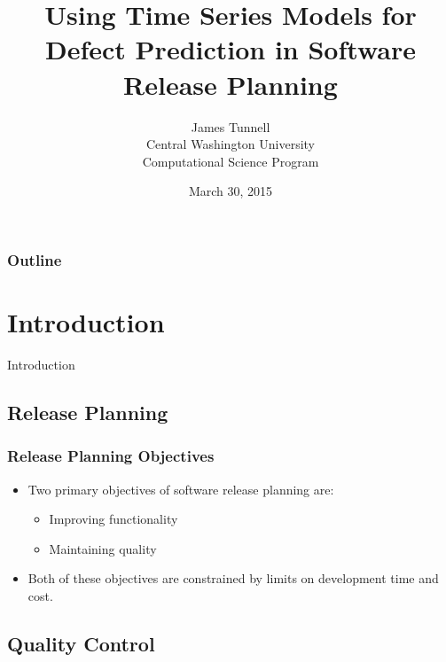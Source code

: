 \documentclass[presentation]{beamer}
\begin{document}
\title{Using Time Series Models for Defect Prediction in Software Release Planning}
\author{James Tunnell \\
Central Washington University \\
Computational Science Program}
\date{March 30, 2015}

\begin{frame}
\titlepage
\end{frame}

\begin{frame}
\small{
\frametitle{Outline}
\tableofcontents[hideallsubsections] 
}
\end{frame}

\section{Introduction}

\begin{frame}
\begin{center}
\Large{Introduction}
\end{center}
\end{frame}

\subsection{Release Planning}

\begin{frame}[t]
\frametitle{Release Planning Objectives}
\begin{itemize}
\item{Two primary objectives of software release planning are:
  \begin{itemize}
    \item{Improving functionality}
    \item{Maintaining quality}
  \end{itemize}}
  \item{Both of these objectives are constrained by limits on development time and cost.}
\end{itemize}
\end{frame}

\subsection{Quality Control}
\end{document}

